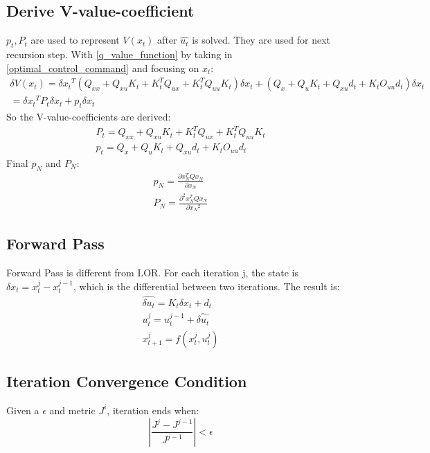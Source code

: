 \documentclass{article}
\begin{document}
\subsection{Derive V-value-coefficient}
$p_t, P_t$ are used to represent $V(x_t)$ after $\hat{u_t}$ is solved. They are used for next recursion step. With \eqref{q_value_function} by taking in \eqref{optimal_control_command} and focusing on $x_t$:
\begin{gather}
    \delta{V(x_t)} = \delta{x_t}^T(Q_{xx} + Q_{xu} K_t + K_t^T Q_{ux} + K_t^TQ_{uu}K_t)\delta{x_t} + (Q_x + Q_u K_t + Q_{xu} d_t + K_t O_{uu} d_t) \delta{x_t}\\
    = \delta{x_t}^T P_t \delta{x_t} + p_t \delta{x_t}
\end{gather}
So the V-value-coefficients are derived:
\begin{gather}
    P_t = Q_{xx} + Q_{xu} K_t + K_t^T Q_{ux} + K_t^TQ_{uu}K_t\\
    p_t = Q_x + Q_u K_t + Q_{xu} d_t + K_t O_{uu} d_t
\end{gather}
Final $p_N$ and $P_N$:
\begin{gather}
    p_N = \frac{\partial{x_N^T Q x_N}}{\partial{x_N}}\\
    P_N = \frac{\partial^2{x_N^T Q x_N}}{\partial{x_N}^2}
\end{gather}

\subsection{Forward Pass}
Forward Pass is different from LOR. For each iteration j, the state is $\delta{x_t} = x_t^{j} - x_t^{j-1}$, which is the differential between two iterations. The result is:
\begin{gather}
    \hat{\delta{u_t}} = K_t \delta{x_t} + d_t\\
    u_t^j = u_t^{j-1} + \hat{\delta{u_t}} \\
    x_{t+1}^j = f(x_t^j, u_t^j)
\end{gather}

\subsection{Iteration Convergence Condition}
Given a $\epsilon$ and metric $J^i$, iteration ends when:
\begin{equation}
    |\frac{J^{j} - J^{j-1}}{J^{j-1}}| < \epsilon
\end{equation}
\end{document}
